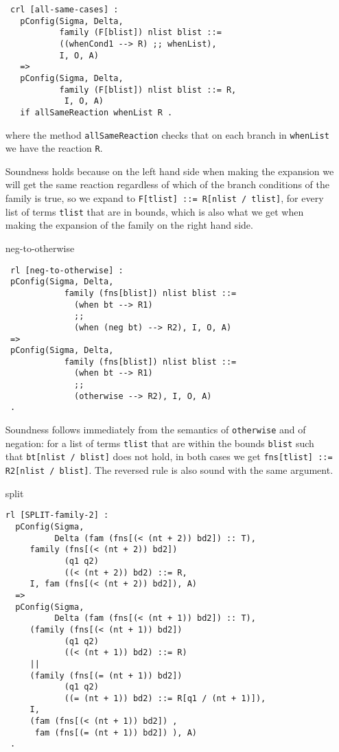 \documentclass{article}
\begin{document}
\begin{itemize}
\begin{lstlisting}
 crl [all-same-cases] :
   pConfig(Sigma, Delta, 
           family (F[blist]) nlist blist ::= 
           ((whenCond1 --> R) ;; whenList), 
           I, O, A)
   =>         
   pConfig(Sigma, Delta, 
           family (F[blist]) nlist blist ::= R,   
            I, O, A) 
   if allSameReaction whenList R .
\end{lstlisting}

\noindent where the method \texttt{allSameReaction} checks that on each branch in \texttt{whenList} we have the reaction \texttt{R}.

Soundness holds because on the left hand side when making the expansion we will
get the same reaction regardless of which of the branch
conditions of the family is true, so we expand to
\texttt{F[tlist] ::= R[nlist / tlist]}, for every
list of terms \texttt{tlist} that are in bounds,
which is also what we get when
making the expansion of the family on the right hand side.

\item[neg-to-otherwise]
\begin{lstlisting}
 rl [neg-to-otherwise] :
 pConfig(Sigma, Delta, 
            family (fns[blist]) nlist blist ::= 
              (when bt --> R1)
              ;;
              (when (neg bt) --> R2), I, O, A) 
 =>
 pConfig(Sigma, Delta, 
            family (fns[blist]) nlist blist ::= 
              (when bt --> R1)
              ;;
              (otherwise --> R2), I, O, A)    
 .  
\end{lstlisting}

Soundness follows immediately from the semantics of \texttt{otherwise}
and of negation: for a list of terms \texttt{tlist} that are within
the bounds \texttt{blist} such that \texttt{bt[nlist / blist]} does not hold,
in both cases we get \texttt{fns[tlist] ::= R2[nlist / blist]}.
The reversed rule is also sound with the same argument.

\item[split]

\begin{lstlisting}
rl [SPLIT-family-2] : 
  pConfig(Sigma, 
          Delta (fam (fns[(< (nt + 2)) bd2]) :: T), 
     family (fns[(< (nt + 2)) bd2]) 
            (q1 q2) 
            ((< (nt + 2)) bd2) ::= R, 
     I, fam (fns[(< (nt + 2)) bd2]), A)
  => 
  pConfig(Sigma, 
          Delta (fam (fns[(< (nt + 1)) bd2]) :: T), 
     (family (fns[(< (nt + 1)) bd2]) 
            (q1 q2) 
            ((< (nt + 1)) bd2) ::= R)
     ||
     (family (fns[(= (nt + 1)) bd2]) 
            (q1 q2) 
            ((= (nt + 1)) bd2) ::= R[q1 / (nt + 1)]), 
     I, 
     (fam (fns[(< (nt + 1)) bd2]) , 
      fam (fns[(= (nt + 1)) bd2]) ), A)
 . 
\end{lstlisting}


\end{itemize}
\end{document}

